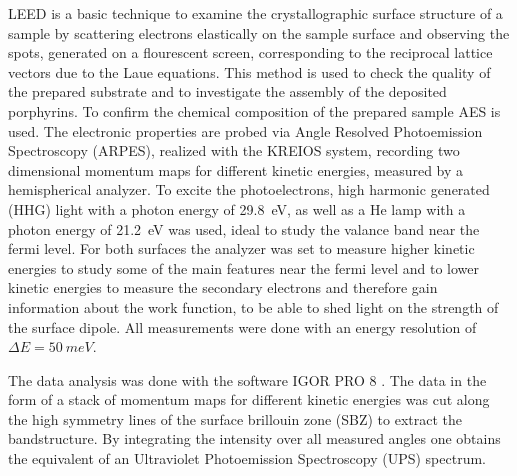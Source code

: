 LEED is a basic technique to examine the crystallographic surface structure of a sample by scattering electrons elastically on the sample surface and observing the spots, generated on a flourescent screen, corresponding to the reciprocal lattice vectors due to the Laue equations.
This method is used to check the quality of the prepared substrate and to investigate the assembly of the deposited porphyrins.
To confirm the chemical composition of the prepared sample AES is used.
The electronic properties are probed via Angle Resolved Photoemission Spectroscopy (ARPES), realized with the KREIOS system, recording two dimensional momentum maps for different kinetic energies, measured by a hemispherical analyzer.
To excite the photoelectrons, high harmonic generated (HHG) light with a photon energy of \qty{29,8}{eV}, as well as a He lamp with a photon energy of \qty{21,2}{eV} was used, ideal to study the valance band near the fermi level.
For both surfaces the analyzer was set to measure higher kinetic energies to study some of the main features near the fermi level and to lower kinetic energies to measure the secondary electrons and therefore gain information about the work function, to be able to shed light on the strength of the surface dipole.
All measurements were done with an energy resolution of $\Delta E = \qty{50}{meV}$.

The data analysis was done with the software IGOR PRO 8 \cite*{wavemetrics_igor_nodate}.
The data in the form of a stack of momentum maps for different kinetic energies was cut along the high symmetry lines of the surface brillouin zone (SBZ) to extract the bandstructure.
By integrating the intensity over all measured angles one obtains the equivalent of an Ultraviolet Photoemission Spectroscopy (UPS) spectrum.

